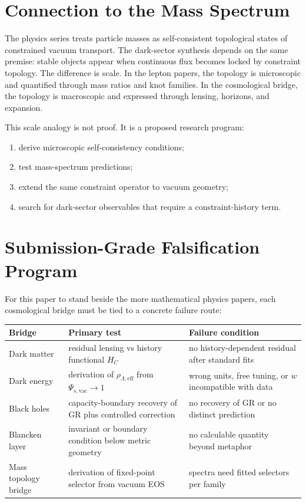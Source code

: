 \documentclass[11pt]{article}
\begin{document}
\section{Connection to the Mass Spectrum}

The physics series treats particle masses as self-consistent topological states of constrained vacuum transport. The dark-sector synthesis depends on the same premise: stable objects appear when continuous flux becomes locked by constraint topology. The difference is scale. In the lepton papers, the topology is microscopic and quantified through mass ratios and knot families. In the cosmological bridge, the topology is macroscopic and expressed through lensing, horizons, and expansion.

This scale analogy is not proof. It is a proposed research program:
\begin{enumerate}
    \item derive microscopic self-consistency conditions;
    \item test mass-spectrum predictions;
    \item extend the same constraint operator to vacuum geometry;
    \item search for dark-sector observables that require a constraint-history term.
\end{enumerate}

\section{Submission-Grade Falsification Program}

For this paper to stand beside the more mathematical physics papers, each
cosmological bridge must be tied to a concrete failure route:
\begin{center}
\begin{tabular}{p{}p{}p{}}
\toprule
\textbf{Bridge} & \textbf{Primary test} & \textbf{Failure condition}\\
\midrule
Dark matter & residual lensing vs history functional $H_C$ & no history-dependent residual after standard fits\\
Dark energy & derivation of $\rho_{\Lambda,\mathrm{eff}}$ from $\Psi_{s,\mathrm{vac}}\to1$ & wrong units, free tuning, or $w$ incompatible with data\\
Black holes & capacity-boundary recovery of GR plus controlled correction & no recovery of GR or no distinct prediction\\
Blancken layer & invariant or boundary condition below metric geometry & no calculable quantity beyond metaphor\\
Mass topology bridge & derivation of fixed-point selector from vacuum EOS & spectra need fitted selectors per family\\
\bottomrule
\end{tabular}
\end{center}
\end{document}

